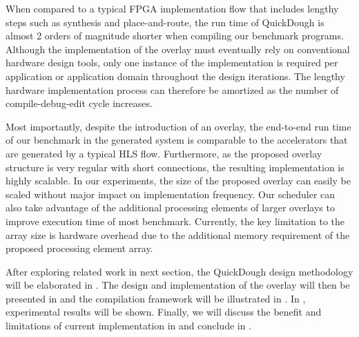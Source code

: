When compared to a typical FPGA implementation flow that includes lengthy steps such as synthesis and place-and-route, the run time of QuickDough is almost 2 orders of magnitude shorter when compiling our benchmark programs.
Although the implementation of the overlay must eventually rely on conventional hardware design tools, only one instance of the implementation is required per application or application domain throughout the design iterations.  The lengthy hardware implementation process can therefore be amortized as the number of compile-debug-edit cycle increases.

Most importantly, despite the introduction of an overlay, the end-to-end run time of our benchmark in the generated system is comparable to the accelerators that are generated by a typical HLS flow.
Furthermore, as the proposed overlay structure is very regular with short connections, the resulting implementation is highly scalable.
In our experiments, the size of the proposed overlay can easily be scaled without major impact on implementation frequency.
Our scheduler can also take advantage of the additional processing elements of larger overlays to improve execution time of most benchmark.
Currently, the key limitation to the array size is hardware overhead due to the additional memory requirement of the proposed processing element array.


After exploring related work in next section, the QuickDough design methodology will be elaborated in .  The design and implementation of the overlay will then be presented in   and the compilation framework will be illustrated in .  In , experimental results will be shown.  Finally, we will discuss the benefit and limitations of current implementation in  and conclude in .
